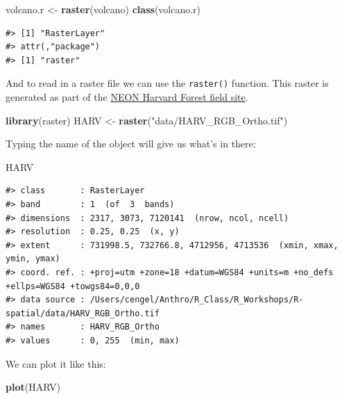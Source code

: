 \documentclass[]{book}
\newenvironment{Shaded}{\begin{snugshade}}{\end{snugshade}}
\newcommand{\KeywordTok}[1]{\textcolor[rgb]{0.13,0.29,0.53}{\textbf{#1}}}
\newcommand{\StringTok}[1]{\textcolor[rgb]{0.31,0.60,0.02}{#1}}
\newcommand{\NormalTok}[1]{#1}
\begin{document}
\begin{Shaded}
\begin{Highlighting}[]
\NormalTok{volcano.r <-}\StringTok{ }\KeywordTok{raster}\NormalTok{(volcano)}
\KeywordTok{class}\NormalTok{(volcano.r)}
\end{Highlighting}
\end{Shaded}

\begin{verbatim}
#> [1] "RasterLayer"
#> attr(,"package")
#> [1] "raster"
\end{verbatim}

And to read in a raster file we can use the \texttt{raster()} function.
This raster is generated as part of the
\href{https://www.neonscience.org/field-sites/field-sites-map/HARV}{NEON
Harvard Forest field site}.

\begin{Shaded}
\begin{Highlighting}[]
\KeywordTok{library}\NormalTok{(raster)}
\NormalTok{HARV <-}\StringTok{ }\KeywordTok{raster}\NormalTok{(}\StringTok{"data/HARV_RGB_Ortho.tif"}\NormalTok{)}
\end{Highlighting}
\end{Shaded}

Typing the name of the object will give us what's in there:

\begin{Shaded}
\begin{Highlighting}[]
\NormalTok{HARV}
\end{Highlighting}
\end{Shaded}

\begin{verbatim}
#> class       : RasterLayer 
#> band        : 1  (of  3  bands)
#> dimensions  : 2317, 3073, 7120141  (nrow, ncol, ncell)
#> resolution  : 0.25, 0.25  (x, y)
#> extent      : 731998.5, 732766.8, 4712956, 4713536  (xmin, xmax, ymin, ymax)
#> coord. ref. : +proj=utm +zone=18 +datum=WGS84 +units=m +no_defs +ellps=WGS84 +towgs84=0,0,0 
#> data source : /Users/cengel/Anthro/R_Class/R_Workshops/R-spatial/data/HARV_RGB_Ortho.tif 
#> names       : HARV_RGB_Ortho 
#> values      : 0, 255  (min, max)
\end{verbatim}

We can plot it like this:

\begin{Shaded}
\begin{Highlighting}[]
\KeywordTok{plot}\NormalTok{(HARV)}
\end{Highlighting}
\end{Shaded}
\end{document}
